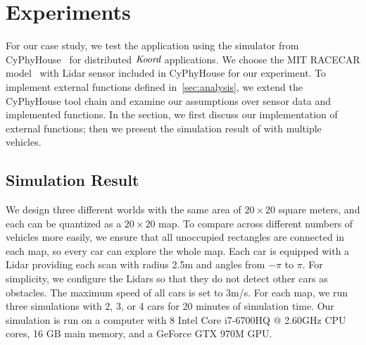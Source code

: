 \newcommand{\Koord}{\ensuremath{\lgname}\xspace}
\newcommand{\CyPhyHouse}{CyPhyHouse\xspace}
\newcommand{\Gazebo}{Gazebo\xspace}

\newcommand{\ScanToMap}{\ensuremath{\mathit{scanToMap}}\xspace}
\newcommand{\TSync}{\ensuremath{\mathit{tSync}}\xspace}
\newcommand{\PathToFrontier}{\ensuremath{\mathit{pickPathToFrontier}}\xspace}

\section{Experiments}
\label{sec:experiments}


For our case study, we test the \dmap application using the simulator from \CyPhyHouse~\cite{ghosh2019cyphyhouse} for distributed \Koord applications.
We choose the MIT RACECAR model~\cite{MIT_RACECAR} with Lidar sensor included in \CyPhyHouse for our experiment.
To implement external functions defined in~\ref{sec:analysis},
we extend the \CyPhyHouse tool chain and examine our assumptions over sensor data and implemented functions.
In the section, we first discuss our implementation of external functions;
then we present the simulation result of \dmap with multiple vehicles.

\subsection{Simulation Result}

We design three different worlds with the same area of $20\times20$ square meters,
and each can be quantized as a $20 \times 20$ map.
To compare across different numbers of vehicles more easily,
we ensure that all unoccupied rectangles are connected in each map,
so every car can explore the whole map.
Each car is equipped with a Lidar providing each scan with radius 2.5m and angles from $-\pi$ to $\pi$.
For simplicity, we configure the Lidars so that they do not detect other cars as obstacles.
The maximum speed of all cars is set to 3m/s.
For each map, we run three simulations with 2, 3, or 4 cars for 20 minutes of simulation time.
Our simulation is run on a computer with 8 Intel Core i7-6700HQ @ 2.60GHz CPU cores, 16 GB main memory, and a GeForce GTX 970M GPU.

